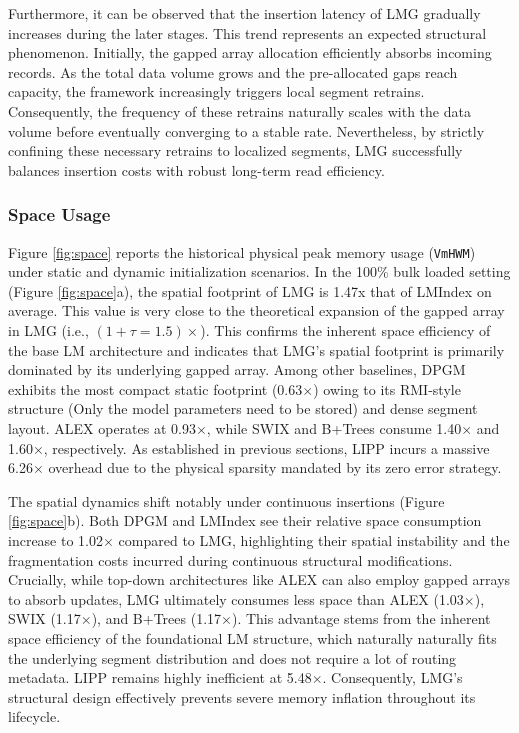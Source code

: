 Furthermore, it can be observed that the insertion latency of LMG gradually increases during the later stages. This trend represents an expected structural phenomenon. Initially, the gapped array allocation efficiently absorbs incoming records. As the total data volume grows and the pre-allocated gaps reach capacity, the framework increasingly triggers local segment retrains. Consequently, the frequency of these retrains naturally scales with the data volume before eventually converging to a stable rate. Nevertheless, by strictly confining these necessary retrains to localized segments, LMG successfully balances insertion costs with robust long-term read efficiency.

\subsubsection{Space Usage}
Figure \ref{fig:space} reports the historical physical peak memory usage (\texttt{VmHWM}) under static and dynamic initialization scenarios. In the 100\% bulk loaded setting (Figure \ref{fig:space}a), the spatial footprint of LMG is 1.47x that of LMIndex on average. This value is very close to the theoretical expansion of the gapped array in LMG (i.e., $(1 + \tau = 1.5)\times$). This confirms the inherent space efficiency of the base LM architecture and indicates that LMG's spatial footprint is primarily dominated by its underlying gapped array. Among other baselines, DPGM exhibits the most compact static footprint (0.63$\times$) owing to its RMI-style structure (Only the model parameters need to be stored) and dense segment layout. ALEX operates at 0.93$\times$, while SWIX and B+Trees consume 1.40$\times$ and 1.60$\times$, respectively. As established in previous sections, LIPP incurs a massive 6.26$\times$ overhead due to the physical sparsity mandated by its zero error strategy.

The spatial dynamics shift notably under continuous insertions (Figure \ref{fig:space}b). Both DPGM and LMIndex see their relative space consumption increase to 1.02$\times$ compared to LMG, highlighting their spatial instability and the fragmentation costs incurred during continuous structural modifications. Crucially, while top-down architectures like ALEX can also employ gapped arrays to absorb updates, LMG ultimately consumes less space than ALEX (1.03$\times$), SWIX (1.17$\times$), and B+Trees (1.17$\times$). This advantage stems from the inherent space efficiency of the foundational LM structure, which naturally naturally fits the underlying segment distribution and does not require a lot of routing metadata. LIPP remains highly inefficient at 5.48$\times$. Consequently, LMG's structural design effectively prevents severe memory inflation throughout its lifecycle.

